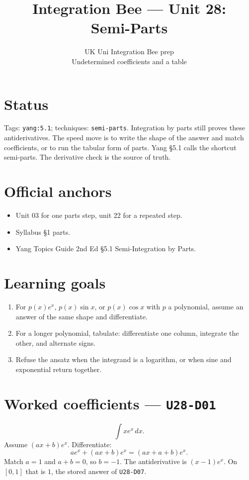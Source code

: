 
\title{Integration Bee --- Unit 28:\\ Semi-Parts}
\author{UK Uni Integration Bee prep\\ Undetermined coefficients and a table}
\date{}

\maketitle
\section*{Status}
Tags: \texttt{yang:5.1}; techniques: \texttt{semi-parts}.
Integration by parts still proves these antiderivatives. The speed move is to write the shape of the answer and match coefficients, or to run the tabular form of parts. Yang \S5.1 calls the shortcut semi-parts. The derivative check is the source of truth.
\section{Official anchors}
\begin{itemize}
\item Unit 03 for one parts step, unit 22 for a repeated step.
\item Syllabus \S1 parts.
\item Yang Topics Guide 2nd Ed \S5.1 Semi-Integration by Parts.
\end{itemize}
\section{Learning goals}
\begin{enumerate}
  \item For $p(x)e^x$, $p(x)\sin x$, or $p(x)\cos x$ with $p$ a polynomial, assume an answer of the same shape and differentiate.
  \item For a longer polynomial, tabulate: differentiate one column, integrate the other, and alternate signs.
  \item Refuse the ansatz when the integrand is a logarithm, or when sine and exponential return together.
\end{enumerate}

\section{Worked coefficients --- \texttt{U28-D01}}
\[
\int x e^x\,dx.
\]
Assume $(ax+b)e^x$. Differentiate:
\[
ae^x+(ax+b)e^x=(ax+a+b)e^x.
\]
Match $a=1$ and $a+b=0$, so $b=-1$. The antiderivative is $(x-1)e^x$. On $[0,1]$ that is $1$, the stored answer of \texttt{U28-D07}.

